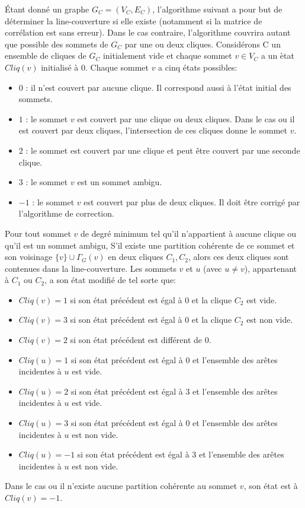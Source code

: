 \'Etant donn\'e un graphe $G_C = (V_C,E_C)$, l'algorithme suivant a pour but de d\'eterminer la line-couverture si elle existe (notamment si la matrice de corr\'elation est sans erreur). 
Dans le cas contraire, l'algorithme couvrira autant que possible des sommets de $G_C$ par une ou deux cliques.
\newline
Consid\'erons {\cal C} un ensemble de cliques de $G_C$ initialement vide et chaque sommet $v \in V_C$ a un \`etat  $Cliq(v)$ initialis\'e \`a $0$.
\newline
Chaque sommet $v$ a cinq \'etats possibles:
\begin{itemize}
	\item $0$ : il n'est couvert par aucune clique. Il correspond aussi \`a l'\'etat initial des sommets.
	\item $1$ : le sommet $v$ est couvert par une clique ou deux cliques. Dans le cas ou il est couvert par deux cliques, l'intersection de ces cliques donne le sommet $v$.
	\item $2$ : le sommet est couvert par une clique et peut \^etre couvert par une seconde clique.
	\item $3$ : le sommet $v$ est un sommet ambigu.
	\item $-1$ :  le sommet $v$ est couvert par plus de deux cliques. Il doit \^etre corrig\'e par l'algorithme de correction.
\end{itemize}
Pour tout sommet $v$ de degr\'e minimum tel qu'il n'appartient \`a aucune clique ou qu'il est un sommet ambigu, S'il existe une partition coh\'erente de ce sommet et son voisinage $\{v\} \cup \Gamma_G(v)$ en deux cliques $C_1, C_2$, alors ces deux cliques sont contenues dans la line-couverture. Les sommets $v$ et $u$ (avec $u \neq v$), appartenant \`a $C_1$ ou $C_2$, a son \'etat modifi\'e de tel sorte que:
\begin{itemize}
\item $Cliq(v) = 1$ si son \'etat pr\'ec\'edent est \'egal \`a $0$ et la clique $C_2$ est vide. 
\item $Cliq(v) = 3$ si son \'etat pr\'ec\'edent est \'egal \`a $0$ et la clique $C_2$ est non vide. 
\item $Cliq(v) = 2$ si son \'etat pr\'ec\'edent est diff\'erent de $0$.
\item $Cliq(u) = 1$ si son \'etat pr\'ec\'edent est \'egal \`a $0$ et l'ensemble des ar\^etes incidentes \`a $u$ est vide.
\item $Cliq(u) = 2$ si son \'etat pr\'ec\'edent est \'egal \`a $3$ et l'ensemble des ar\^etes incidentes \`a $u$ est vide.
\item $Cliq(u) = 3$ si son \'etat pr\'ec\'edent est \'egal \`a $0$ et l'ensemble des ar\^etes incidentes \`a $u$ est non vide.
\item $Cliq(u) = -1$ si son \'etat pr\'ec\'edent est \'egal \`a $3$ et l'ensemble des ar\^etes incidentes \`a $u$ est non vide.
\end{itemize} 
Dans le cas ou il n'existe aucune partition coh\'erente au sommet $v$, son \'etat est \`a $Cliq(v)=-1$.

